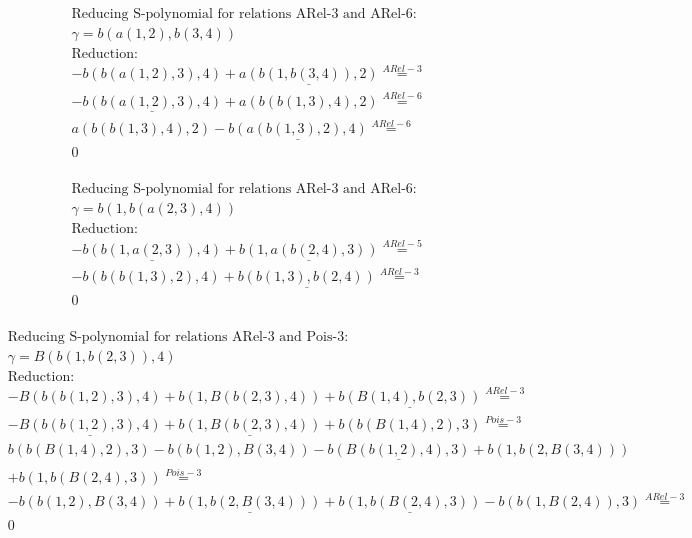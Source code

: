 \documentclass[11pt]{amsart}
\begin{document}
\begin{align*} 
& \text{Reducing S-polynomial for relations ARel-3 and ARel-6:} \\ 
& \gamma = b(a(1,2),b(3,4)) \\ 
& \text{Reduction}: \\& - b(b(a(1,2),3),4) + \underline{a(b(1,b(3,4)),2)} \stackrel{ ARel-3 }{=}  \\ 
& - \underline{b(b(a(1,2),3),4)} + a(b(b(1,3),4),2) \stackrel{ ARel-6 }{=}  \\ 
&a(b(b(1,3),4),2) - \underline{b(a(b(1,3),2),4)} \stackrel{ ARel-6 }{=}  \\ 
&0\\ 
\end{align*} 
 
\begin{align*} 
& \text{Reducing S-polynomial for relations ARel-3 and ARel-6:} \\ 
& \gamma = b(1,b(a(2,3),4)) \\ 
& \text{Reduction}: \\& - \underline{b(b(1,a(2,3)),4)} + \underline{b(1,a(b(2,4),3))} \stackrel{ ARel-5 }{=}  \\ 
& - b(b(b(1,3),2),4) + \underline{b(b(1,3),b(2,4))} \stackrel{ ARel-3 }{=}  \\ 
&0\\ 
\end{align*} 
 
\begin{align*} 
& \text{Reducing S-polynomial for relations ARel-3 and Pois-3:} \\ 
& \gamma = B(b(1,b(2,3)),4) \\ 
& \text{Reduction}: \\& - B(b(b(1,2),3),4) + b(1,B(b(2,3),4)) + \underline{b(B(1,4),b(2,3))} \stackrel{ ARel-3 }{=}  \\ 
& - \underline{B(b(b(1,2),3),4)} + \underline{b(1,B(b(2,3),4))} + b(b(B(1,4),2),3) \stackrel{ Pois-3 }{=}  \\ 
&b(b(B(1,4),2),3) - b(b(1,2),B(3,4)) - \underline{b(B(b(1,2),4),3)} + b(1,b(2,B(3,4)))\\ 
 &  + b(1,b(B(2,4),3)) \stackrel{ Pois-3 }{=}  \\ 
& - b(b(1,2),B(3,4)) + \underline{b(1,b(2,B(3,4)))} + \underline{b(1,b(B(2,4),3))} - b(b(1,B(2,4)),3) \stackrel{ ARel-3 }{=}  \\ 
&0\\ 
\end{align*} 
 
\end{document}
